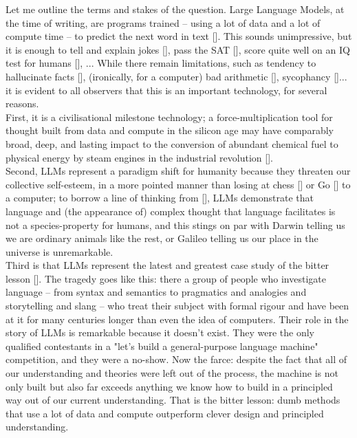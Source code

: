 Let me outline the terms and stakes of the question. Large Language Models, at the time of writing, are programs trained -- using a lot of data and a lot of compute time -- to predict the next word in text []. This sounds unimpressive, but it is enough to tell and explain jokes [], pass the SAT [], score quite well on an IQ test for humans [], ... While there remain limitations, such as tendency to hallucinate facts [], (ironically, for a computer) bad arithmetic [], sycophancy []... it is evident to all observers that this is an important technology, for several reasons.\\
First, it is a civilisational milestone technology; a force-multiplication tool for thought built from data and compute in the silicon age may have comparably broad, deep, and lasting impact to the conversion of abundant chemical fuel to physical energy by steam engines in the industrial revolution [].\\
Second, LLMs represent a paradigm shift for humanity because they threaten our collective self-esteem, in a more pointed manner than losing at chess [] or Go [] to a computer; to borrow a line of thinking from [], LLMs demonstrate that language and (the appearance of) complex thought that language facilitates is not a species-property for humans, and this stings on par with Darwin telling us we are ordinary animals like the rest, or Galileo telling us our place in the universe is unremarkable.\\
Third is that LLMs represent the latest and greatest case study of the bitter lesson []. The tragedy goes like this: there a group of people who investigate language -- from syntax and semantics to pragmatics and analogies and storytelling and slang -- who treat their subject with formal rigour and have been at it for many centuries longer than even the idea of computers. Their role in the story of LLMs is remarkable because it doesn't exist. They were the only qualified contestants in a "let's build a general-purpose language machine" competition, and they were a no-show. Now the farce: despite the fact that all of our understanding and theories were left out of the process, the machine is not only built but also far exceeds anything we know how to build in a principled way out of our current understanding. That is the bitter lesson: dumb methods that use a lot of data and compute outperform clever design and principled understanding.\\

